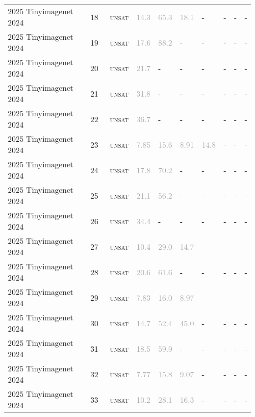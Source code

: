 \begin{center}
{\begin{longtable}{@{}llllllllll@{}}
2025 Tinyimagenet 2024 & 18 & ~\textsc{unsat} & \textcolor{darkgray}{14.3} & \textcolor{darkgray}{65.3} & \textcolor{darkgray}{18.1} & - & - & - & - \\
2025 Tinyimagenet 2024 & 19 & ~\textsc{unsat} & \textcolor{darkgray}{17.6} & \textcolor{darkgray}{88.2} & - & - & - & - & - \\
2025 Tinyimagenet 2024 & 20 & ~\textsc{unsat} & \textcolor{darkgray}{21.7} & - & - & - & - & - & - \\
2025 Tinyimagenet 2024 & 21 & ~\textsc{unsat} & \textcolor{darkgray}{31.8} & - & - & - & - & - & - \\
2025 Tinyimagenet 2024 & 22 & ~\textsc{unsat} & \textcolor{darkgray}{36.7} & - & - & - & - & - & - \\
2025 Tinyimagenet 2024 & 23 & ~\textsc{unsat} & \textcolor{darkgray}{7.85} & \textcolor{darkgray}{15.6} & \textcolor{darkgray}{8.91} & \textcolor{darkgray}{14.8} & - & - & - \\
2025 Tinyimagenet 2024 & 24 & ~\textsc{unsat} & \textcolor{darkgray}{17.8} & \textcolor{darkgray}{70.2} & - & - & - & - & - \\
2025 Tinyimagenet 2024 & 25 & ~\textsc{unsat} & \textcolor{darkgray}{21.1} & \textcolor{darkgray}{56.2} & - & - & - & - & - \\
2025 Tinyimagenet 2024 & 26 & ~\textsc{unsat} & \textcolor{darkgray}{34.4} & - & - & - & - & - & - \\
2025 Tinyimagenet 2024 & 27 & ~\textsc{unsat} & \textcolor{darkgray}{10.4} & \textcolor{darkgray}{29.0} & \textcolor{darkgray}{14.7} & - & - & - & - \\
2025 Tinyimagenet 2024 & 28 & ~\textsc{unsat} & \textcolor{darkgray}{20.6} & \textcolor{darkgray}{61.6} & - & - & - & - & - \\
2025 Tinyimagenet 2024 & 29 & ~\textsc{unsat} & \textcolor{darkgray}{7.83} & \textcolor{darkgray}{16.0} & \textcolor{darkgray}{8.97} & - & - & - & - \\
2025 Tinyimagenet 2024 & 30 & ~\textsc{unsat} & \textcolor{darkgray}{14.7} & \textcolor{darkgray}{52.4} & \textcolor{darkgray}{45.0} & - & - & - & - \\
2025 Tinyimagenet 2024 & 31 & ~\textsc{unsat} & \textcolor{darkgray}{18.5} & \textcolor{darkgray}{59.9} & - & - & - & - & - \\
2025 Tinyimagenet 2024 & 32 & ~\textsc{unsat} & \textcolor{darkgray}{7.77} & \textcolor{darkgray}{15.8} & \textcolor{darkgray}{9.07} & - & - & - & - \\
2025 Tinyimagenet 2024 & 33 & ~\textsc{unsat} & \textcolor{darkgray}{10.2} & \textcolor{darkgray}{28.1} & \textcolor{darkgray}{16.3} & - & - & - & - \\

\end{longtable}}
\end{center}
